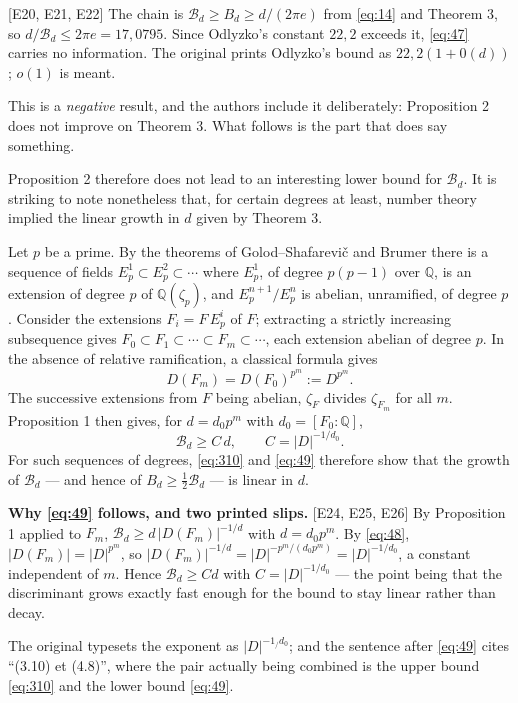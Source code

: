 \documentclass[11pt,reqno]{amsart}
\theoremstyle{plain}
\theoremstyle{definition}
\theoremstyle{remark}
\newcommand{\Q}{\mathbb{Q}}
\newcommand{\Bcal}{\mathcal{B}}
\newcommand{\Ledger}[1]{{\scriptsize\textsf{[#1]}}}
\begin{document}
\begin{expansion}
\Ledger{E20, E21, E22} The chain is $\Bcal_d\ge B_d\ge d/(2\pi e)$ from
\eqref{eq:14} and Theorem 3, so $d/\Bcal_d\le2\pi e=17{,}0795$. Since Odlyzko's
constant $22{,}2$ exceeds it, \eqref{eq:47} carries no information. The original
prints Odlyzko's bound as $22{,}2(1+0(d))$; $o(1)$ is meant.

This is a \emph{negative} result, and the authors include it deliberately:
Proposition 2 does not improve on Theorem 3. What follows is the part that does say
something.
\end{expansion}

Proposition 2 therefore does not lead to an interesting lower bound for $\Bcal_d$. It
is striking to note nonetheless that, for certain degrees at least, number theory
implied the linear growth in $d$ given by Theorem 3.

Let $p$ be a prime. By the theorems of Golod--Shafarevi\v c and Brumer there is a
sequence of fields $E_p^1\subset E_p^2\subset\cdots$ where $E_p^1$, of degree $p(p-1)$
over $\Q$, is an extension of degree $p$ of $\Q(\zeta_p)$, and $E_p^{n+1}/E_p^n$ is
abelian, unramified, of degree $p$. Consider the extensions $F_i=F\,E_p^i$ of $F$;
extracting a strictly increasing subsequence gives
$F_0\subset F_1\subset\cdots\subset F_m\subset\cdots$, each extension abelian of
degree $p$. In the absence of relative ramification, a classical formula gives
\begin{equation}\label{eq:48}
 D(F_m)=D(F_0)^{p^m}:=D^{p^m} .
\end{equation}
The successive extensions from $F$ being abelian, $\zeta_F$ divides $\zeta_{F_m}$ for
all $m$. Proposition 1 then gives, for $d=d_0p^m$ with $d_0=[F_0:\Q]$,
\begin{equation}\label{eq:49}
 \Bcal_d\ge C\,d,\qquad C=|D|^{-1/d_0} .
\end{equation}
For such sequences of degrees, \eqref{eq:310} and \eqref{eq:49} therefore show that
the growth of $\Bcal_d$ --- and hence of $B_d\ge\tfrac12\Bcal_d$ --- is linear in $d$.

\begin{expansion}
\textbf{Why \eqref{eq:49} follows, and two printed slips.} \Ledger{E24, E25, E26}
By Proposition 1 applied to $F_m$, $\Bcal_d\ge d\,|D(F_m)|^{-1/d}$ with $d=d_0p^m$.
By \eqref{eq:48}, $|D(F_m)|=|D|^{p^m}$, so
$|D(F_m)|^{-1/d}=|D|^{-p^m/(d_0p^m)}=|D|^{-1/d_0}$, a constant independent of $m$.
Hence $\Bcal_d\ge C d$ with $C=|D|^{-1/d_0}$ --- the point being that the
discriminant grows exactly fast enough for the bound to stay linear rather than
decay.

The original typesets the exponent as $|D|^{-1_/d_0}$; and the sentence after
\eqref{eq:49} cites ``(3.10) et (4.8)'', where the pair actually being combined is the
upper bound \eqref{eq:310} and the lower bound \eqref{eq:49}.
\end{expansion}
\end{document}

